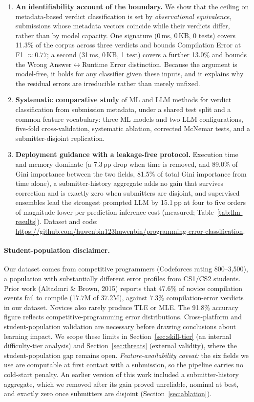 \documentclass[acmsmall]{acmart}
\begin{document}
\begin{enumerate}
 \item \textbf{An identifiability account of the boundary.} We show that the
 ceiling on metadata-based verdict classification is set by \emph{observational
 equivalence}, submissions whose metadata vectors coincide while their verdicts
 differ, rather than by model capacity. One signature (0\,ms, 0\,KB, 0 tests)
 covers 11.3\% of the corpus across three verdicts and bounds Compilation Error
 at F1 $\approx 0.77$; a second (31\,ms, 0\,KB, 1 test) covers a further 13.0\%
 and bounds the Wrong Answer$\leftrightarrow$Runtime Error distinction. Because
 the argument is model-free, it holds for any classifier given these inputs, and
 it explains why the residual errors are irreducible rather than merely unfixed.
 \item \textbf{Systematic comparative study} of ML and LLM methods for verdict
 classification from submission metadata, under a shared test split and a common
 feature vocabulary: three ML models and two LLM configurations, five-fold
 cross-validation, systematic ablation, corrected McNemar tests, and a
 submitter-disjoint replication.
 \item \textbf{Deployment guidance with a leakage-free protocol.} Execution time
 and memory dominate (a 7.3\,pp drop when time is removed, and 89.0\% of Gini
 importance between the two fields, 81.5\% of total Gini importance from time alone), a
 submitter-history aggregate adds no gain that survives correction and is
 exactly zero when submitters are disjoint, and supervised ensembles lead the
 strongest prompted LLM by
 15.1\,pp at four to five orders of magnitude lower per-prediction inference
 cost (measured; Table~\ref{tab:llm-results}).
 Dataset and code: \url{https://github.com/huwenbin123huwenbin/programming-error-classification}.
\end{enumerate}

\paragraph{Student-population disclaimer.} Our dataset comes from competitive programmers (Codeforces rating 800--3,500), a population with substantially different error profiles from CS1/CS2 students. Prior work (Altadmri \& Brown, 2015) reports that 47.6\% of novice compilation events fail to compile (17.7M of 37.2M), against 7.3\% compilation-error verdicts in our dataset. Novices also rarely produce TLE or MLE. The 91.8\% accuracy figure reflects competitive-programming error distributions. Cross-platform and student-population validation are necessary before drawing conclusions about learning impact. We scope these limits in Section~\ref{sec:skill-tier} (an internal difficulty-tier analysis) and Section~\ref{sec:threats} (external validity), where the student-population gap remains open. \textit{Feature-availability caveat:} the six fields we use are computable at first contact with a submission, so the pipeline carries no cold-start penalty. An earlier version of this work included a submitter-history aggregate, which we removed after its gain proved unreliable, nominal at best, and exactly zero once submitters are disjoint (Section~\ref{sec:ablation}).
\end{document}
